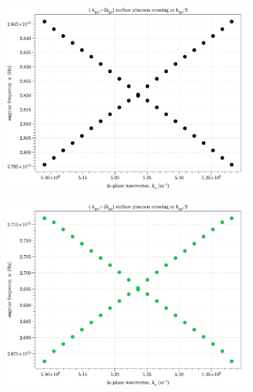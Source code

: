\documentclass[oneside,11pt,book]{book}
\begin{document}
\begin{figure}
\begin{subfigure}[b]{0.3\linewidth}
\centering\includegraphics[width=\linewidth]{temp-bandgaps/2kg-kg-0nm-offset.jpg}
\caption{}
\end{subfigure}
\begin{subfigure}[b]{0.3\linewidth}
\centering\includegraphics[width=\linewidth]{temp-bandgaps/2kgkg-150nm-yoffset.jpg}
\caption{}
\end{subfigure}
\begin{subfigure}[b]{0.3\linewidth}

\end{subfigure}
\end{figure}
\end{document}
